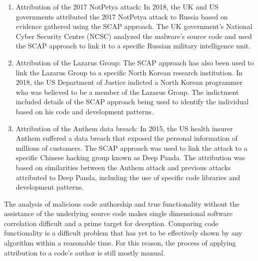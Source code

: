 \documentclass[12pt]{report}
\begin{document}
\begin{enumerate}
  \item Attribution of the 2017 NotPetya attack: In 2018, the UK and US governments attributed the 2017 NotPetya attack to Russia based on evidence gathered using the SCAP approach. The UK government's National Cyber Security Centre (NCSC) analyzed the malware's source code and used the SCAP approach to link it to a specific Russian military intelligence unit.
  \item Attribution of the Lazarus Group: The SCAP approach has also been used to link the Lazarus Group to a specific North Korean research institution. In 2018, the US Department of Justice indicted a North Korean programmer who was believed to be a member of the Lazarus Group. The indictment included details of the SCAP approach being used to identify the individual based on his code and development patterns.
  \item Attribution of the Anthem data breach: In 2015, the US health insurer Anthem suffered a data breach that exposed the personal information of millions of customers. The SCAP approach was used to link the attack to a specific Chinese hacking group known as Deep Panda. The attribution was based on similarities between the Anthem attack and previous attacks attributed to Deep Panda, including the use of specific code libraries and development patterns.
\end{enumerate}

The analysis of malicious code authorship and true functionality without the assistance of the underlying source code makes single dimensional software correlation difficult and a prime target for deception.  Comparing code functionality is a difficult problem that has yet to be effectively shown by any algorithm within a reasonable time.  For this reason, the process of applying attribution to a code's author is still mostly manual.
\end{document}
